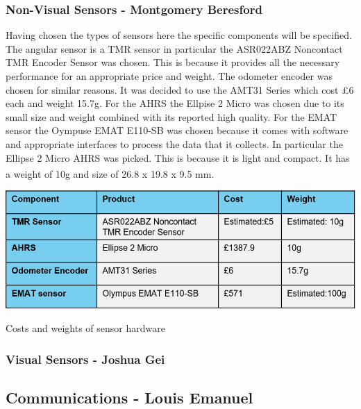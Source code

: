 \documentclass[11pt]{article}		%
\newcommand{\supercite}[1]{\textsuperscript{\cite{#1}}}		%
\begin{document}
		\subsubsection{Non-Visual Sensors - Montgomery Beresford}
		Having chosen the types of sensors here the specific components will be specified. The angular sensor is a TMR sensor in particular the ASR022ABZ Noncontact TMR Encoder Sensor was chosen. This is because it provides all the necessary performance for an appropriate price and weight. The odometer encoder was chosen for similar reasons. It was decided to use the AMT31 Series which cost £6 each and weight 15.7g. For the AHRS the Ellpise 2 Micro was chosen due to its small size and weight combined with its reported high quality. For the EMAT sensor the Oympuse EMAT E110-SB was chosen because it comes with software and appropriate interfaces to process the data that it collects.
		In particular the Ellipse 2 Micro AHRS was picked.
            This is because it is light and compact. It has a weight of 10g and size of 26.8 x 19.8 x 9.5 mm. \supercite{Ellipse_Ahrs}
	  		\begin{table}[H]
	  		
	  		\centering
	  		\includegraphics[scale=0.7]{smaller component sensor table}
				\caption{Costs and weights of sensor hardware}
				\label{sensorHardware}
			\end{table}
		\subsubsection{Visual Sensors - Joshua Gei} \label{visualSensors}
		
		
		
		\subsection[Communications]{Communications - Louis Emanuel}
		
\end{document}
